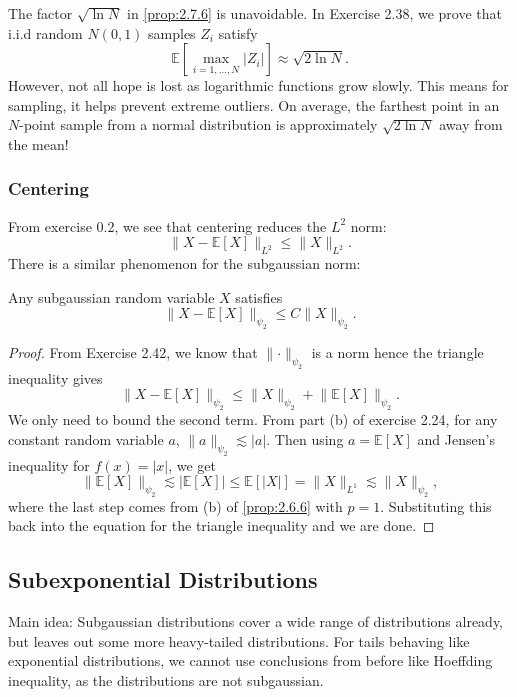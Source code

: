 \begin{remark}
\label{rmk:2.7.7}
The factor $\sqrt{\ln{N}}$ in \cref{prop:2.7.6} is unavoidable. In Exercise 2.38, we prove that 
i.i.d random $N(0, 1)$ samples $Z_i$ satisfy 
\[ \mathbb{E}[\max_{i = 1, \dots, N} |Z_i|] \approx \sqrt{2 \ln{N}}. \]
However, not all hope is lost as logarithmic functions grow slowly. This means for sampling, 
it helps prevent extreme outliers. On average, the farthest point in an $N$-point sample from a 
normal distribution is approximately $\sqrt{2 \ln{N}}$ away from the mean!
\end{remark}


\subsubsection{Centering}
From exercise 0.2, we see that centering reduces the $L^2$ norm: 
\[ \lVert X - \mathbb{E}[X] \rVert_{L^2} \leq \lVert X \rVert_{L^2}. \]
There is a similar phenomenon for the subgaussian norm: 
\begin{lemma}[Centering]
\label{lem:2.7.8}
Any subgaussian random variable $X$ satisfies 
\[ \lVert X - \mathbb{E}[X] \rVert_{\psi_2} \leq C \lVert X \rVert_{\psi_2}. \]
\end{lemma}

\begin{proof}
From Exercise 2.42, we know that $\lVert \cdot \rVert_{\psi_2}$ is a norm hence the triangle inequality gives 
\[ \lVert X - \mathbb{E}[X] \rVert_{\psi_2} \leq \lVert X \rVert_{\psi_2} 
+ \lVert \mathbb{E}[X] \rVert_{\psi_2}. \]
We only need to bound the second term. From part (b) of exercise 2.24, for any constant random 
variable $a$, $\lVert a \rVert_{\psi_2} \lesssim |a|$. Then using $a = \mathbb{E}[X]$ and Jensen's inequality 
for $f(x) = |x|$, we get
\[ \lVert \mathbb{E}[X] \rVert_{\psi_2} \lesssim |\mathbb{E}[X]| \leq \mathbb{E}[|X|] 
= \lVert X \rVert_{L^1} \lesssim \lVert X \rVert_{\psi_2}, \]
where the last step comes from (b) of \cref{prop:2.6.6} with $p = 1$. Substituting this back into the 
equation for the triangle inequality and we are done.
\end{proof}


\subsection{Subexponential Distributions}
Main idea: Subgaussian distributions cover a wide range of distributions already, but leaves out 
some more heavy-tailed distributions. For tails behaving like exponential distributions, we cannot use 
conclusions from before like Hoeffding inequality, as the distributions are not subgaussian. 


